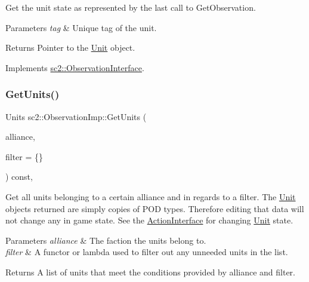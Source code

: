 Get the unit state as represented by the last call to Get\+Observation. 
\begin{DoxyParams}{Parameters}
{\em tag} & Unique tag of the unit. \\
\hline
\end{DoxyParams}
\begin{DoxyReturn}{Returns}
Pointer to the \hyperlink{classsc2_1_1_unit}{Unit} object. 
\end{DoxyReturn}


Implements \hyperlink{classsc2_1_1_observation_interface_a66018504725c872e817ef0a6d0629f29}{sc2\+::\+Observation\+Interface}.

\mbox{\label{classsc2_1_1_observation_imp_a9ec74a3937ae047dbeb78575c79091d4}} 
\subsubsection{\texorpdfstring{Get\+Units()}{GetUnits()}}
{\footnotesize\ttfamily Units sc2\+::\+Observation\+Imp\+::\+Get\+Units (\begin{DoxyParamCaption}\item[{Unit\+::\+Alliance}]{alliance,  }\item[{\hyperlink{sc2__interfaces_8h_af4abbeea3291e718cf2283e1390f3670}{Filter}}]{filter = {\ttfamily \{\}} }\end{DoxyParamCaption}) const\hspace{0.3cm}{\ttfamily [final]}, {\ttfamily [virtual]}}

Get all units belonging to a certain alliance and in regards to a filter. The \hyperlink{classsc2_1_1_unit}{Unit} objects returned are simply copies of P\+OD types. Therefore editing that data will not change any in game state. See the \hyperlink{classsc2_1_1_action_interface}{Action\+Interface} for changing \hyperlink{classsc2_1_1_unit}{Unit} state. 
\begin{DoxyParams}{Parameters}
{\em alliance} & The faction the units belong to. \\
\hline
{\em filter} & A functor or lambda used to filter out any unneeded units in the list. \\
\hline
\end{DoxyParams}
\begin{DoxyReturn}{Returns}
A list of units that meet the conditions provided by alliance and filter. 
\end{DoxyReturn}


